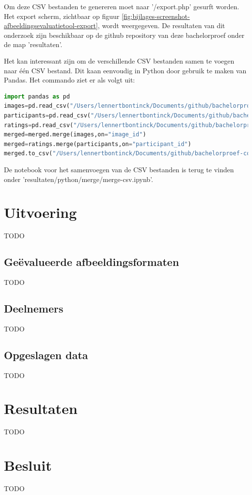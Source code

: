 Om deze CSV bestanden te genereren moet naar '/export.php' gesurft worden. Het export scherm, zichtbaar op figuur \ref{fig:bijlages-screenshot-afbeeldingsevaluatietool-export}, wordt weergegeven. De resultaten van dit onderzoek zijn beschikbaar op de \gls{github} repository van deze bachelorproef onder de map 'resultaten'.

Het kan interessant zijn om de verschillende CSV bestanden samen te voegen naar één CSV bestand. Dit kaan eenvoudig in Python door gebruik te maken van Pandas. Het commando ziet er als volgt uit:

\begin{lstlisting}[language=Python]
import pandas as pd
images=pd.read_csv("/Users/lennertbontinck/Documents/github/bachelorproef-compressie/resultaten/images.csv")
participants=pd.read_csv("/Users/lennertbontinck/Documents/github/bachelorproef-compressie/resultaten/participants.csv")
ratings=pd.read_csv("/Users/lennertbontinck/Documents/github/bachelorproef-compressie/resultaten/ratings.csv")
merged=merged.merge(images,on="image_id")
merged=ratings.merge(participants,on="participant_id")
merged.to_csv("/Users/lennertbontinck/Documents/github/bachelorproef-compressie/resultaten/merged.csv", index=False)
\end{lstlisting}

De notebook voor het samenvoegen van de CSV bestanden is terug te vinden onder 'resultaten/python/merge/merge-csv.ipynb'.

\section{Uitvoering}
\label{sec:onderzoek-uitvoering}

TODO

\subsection{Geëvalueerde afbeeldingsformaten}
\label{sec:onderzoek-uitvoering-afbeeldingsformaten}

TODO

\subsection{Deelnemers}
\label{sec:onderzoek-uitvoering-deelnemers}

TODO

\subsection{Opgeslagen data}
\label{sec:onderzoek-uitvoering-opgeslagen-data}

TODO

\section{Resultaten}
\label{sec:onderzoek-resultaten}

TODO

\section{Besluit}
\label{sec:onderzoek-besluit}

TODO
